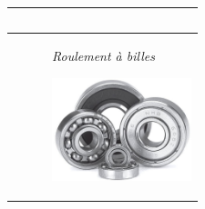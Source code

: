 \documentclass[10pt,oneside]{article}
\begin{document}
\begin{center}
\begin{tabular}{p{} c p{}}
\vspace{3cm}

$\quad$
\\
\hline 

&&
\begin{center}
\textit{Roulement à billes}

\includegraphics[height=3cm]{png/roulement} 
\end{center}\\
\hline 
\end{tabular}
\end{center}
\end{document}
